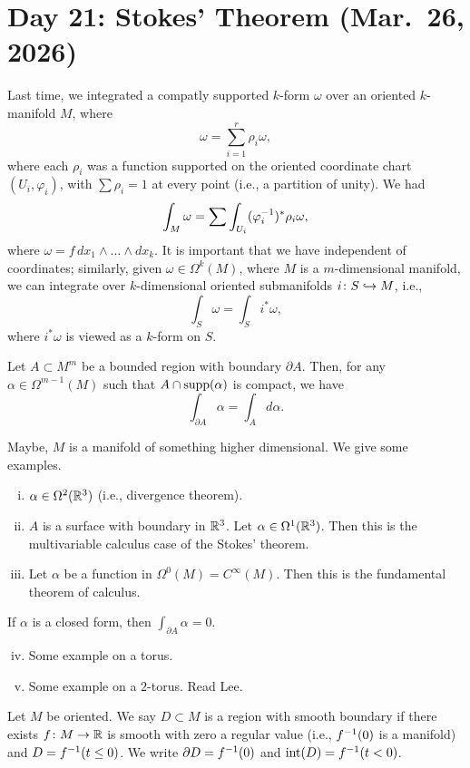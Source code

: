 \section{Day 21: Stokes' Theorem (Mar.\ 26, 2026)}
Last time, we integrated a compatly supported $k$-form $\omega$ over an oriented $k$-manifold $M$, where
\[ \omega = \sum_{i=1}^r \rho_i \omega, \]
where each $\rho_i$ was a function supported on the oriented coordinate chart $(U_i, \varphi_i)$, with $\sum \rho_i = 1$ at every point (i.e., a partition of unity). We had
\[ \int_M \omega = \sum \int_{U_i} (\varphi_i^{-1})^\ast \rho_i \omega, \]
where $\omega = f \, dx_1 \wedge \dots \wedge dx_k$. It is important that we have independent of coordinates; similarly, given $\omega \in \Omega^k(M)$, where $M$ is a $m$-dimensional manifold, we can integrate over $k$-dimensional oriented submanifolds $i \colon S \hookrightarrow M$, i.e.,
\[ \int_S \omega = \int_S i^\ast \omega, \]
where $i^\ast \omega$ is viewed as a $k$-form on $S$.
\begin{theorem}
    Let $A \subset M^m$ be a bounded region with boundary $\partial A$. Then, for any $\alpha \in \Omega^{m-1}(M)$ such that $A \cap \operatorname{supp}(\alpha)$ is compact, we have
    \[ \int_{\partial A} \alpha = \int_A d\alpha. \]
\end{theorem}
Maybe, $M$ is a manifold of something higher dimensional. We give some examples.
\begin{enumerate}[(i)]
    \item $\alpha \in\Omega^2(\mathbb R^3)$ (i.e., divergence theorem).
    \item $A$ is a surface with boundary in $\mathbb R^3$. Let $\alpha \in \Omega^1(\mathbb R^3)$. Then this is the multivariable calculus case of the Stokes' theorem.
    \item Let $\alpha$ be a function in $\Omega^0(M) = C^\infty(M)$. Then this is the fundamental theorem of calculus.
\end{enumerate}
\begin{corollary}
    If $\alpha$ is a closed form, then $\int_{\partial A} \alpha = 0$.
\end{corollary}
\begin{enumerate}[(i)]
    \setcounter{enumi}{3}
    \item Some example on a torus.
    \item Some example on a $2$-torus. Read Lee.
\end{enumerate}
\begin{definition}
    Let $M$ be oriented. We say $D \subset M$ is a region with smooth boundary if there exists $f \colon M \to \mathbb R$ is smooth with zero a regular value (i.e., $f^{-1}(0)$ is a manifold) and $D = f^{-1}(t \leq 0)$. We write $\partial D = f^{-1}(0)$ and $\mathrm{int}(D) = f^{-1}(t < 0)$.
\end{definition}
